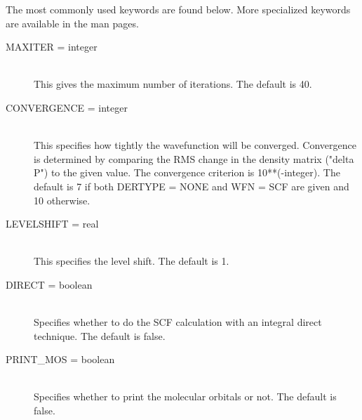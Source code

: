 The most commonly used keywords are found below.  More specialized keywords
are available in the man pages.

\begin{description}
\item[MAXITER = integer]\mbox{}\\
This gives the maximum number of iterations.  The default is 40.
\item[CONVERGENCE = integer]\mbox{}\\
This specifies how tightly the wavefunction will be converged.
Convergence is determined by comparing the RMS change in the
density matrix ("delta P") to the given value.  The convergence
criterion is 10**(-integer).  The default is 7 if both DERTYPE
= NONE and WFN = SCF are given and 10 otherwise.
\item[LEVELSHIFT = real]\mbox{}\\
This specifies the level shift.  The default is 1.
\item[DIRECT = boolean]\mbox{}\\
Specifies whether to do the SCF calculation with an integral direct
technique.  The default is false.
\item[PRINT\_MOS = boolean]\mbox{}\\
Specifies whether to print the molecular orbitals or not.  The default
is false.
\end{description}




